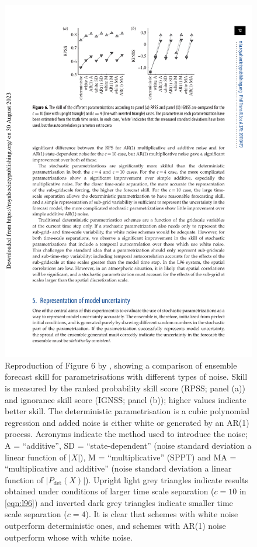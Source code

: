 \documentclass[../main.tex]{subfiles}
\begin{document}
\begin{figure}[ht]
    \centering
    \includegraphics[width=0.6\linewidth]{figures/arnold2013_fig6.pdf}
    \caption{ Reproduction of Figure 6 by \textcite{arnold2013}, showing a
        comparison of ensemble forecast skill for parametrisations with
        different types of noise. Skill is measured by the ranked probability
        skill score (RPSS; panel (a)) and ignorance skill score (IGNSS; panel
        (b)); higher values indicate better skill. The deterministic
        parametrisation is a cubic polynomial regression and added noise is
        either white or generated by an AR(1) process. Acronyms indicate the
        method used to introduce the noise; A = ``additive'', SD =
        ``state-dependent'' (noise standard deviation a linear function of
        $|X|$), M = ``multiplicative'' (SPPT) and MA = ``multiplicative and
        additive'' (noise standard deviation a linear function of
        $|P_\mathrm{det}(X)|$). Upright light grey triangles indicate results
        obtained under conditions of larger time scale separation ($c=10$ in
        \cref{eqn:l96}) and inverted dark grey triangles indicate smaller time
        scale separation ($c=4$). It is clear that schemes with white noise
        outperform deterministic ones, and schemes with AR(1) noise outperform
        whose with white noise. }
    \label{fig:arnold_fig6}
\end{figure}
\end{document}
